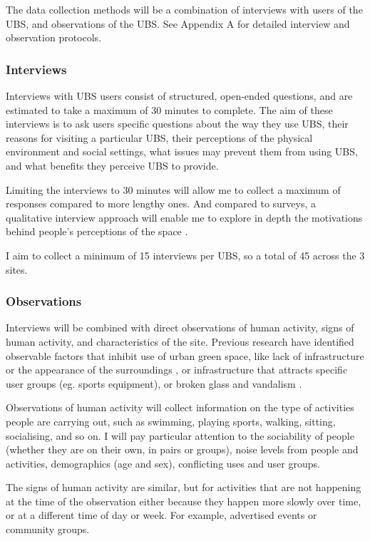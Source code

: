 \documentclass{article}
\begin{document}
The data collection methods will be a combination of interviews with users of the UBS, and observations of the UBS. See Appendix A for detailed interview and observation protocols.

\subsubsection{Interviews}

Interviews with UBS users consist of structured, open-ended questions, and are estimated to take a maximum of 30 minutes to complete. The aim of these interviews is to ask users specific questions about the way they use UBS, their reasons for visiting a particular UBS, their perceptions of the physical environment and social settings, what issues may prevent them from using UBS, and what benefits they perceive UBS to provide.

Limiting the interviews to 30 minutes will allow me to collect a maximum of responses compared to more lengthy ones. And compared to surveys, a qualitative interview approach will enable me to explore in depth the motivations behind people's perceptions of the space \parencite{noel2021social}.

I aim to collect a minimum of 15 interviews per UBS, so a total of 45 across the 3 sites.

\subsubsection{Observations}

Interviews will be combined with direct observations of human activity, signs of human activity, and characteristics of the site. Previous research have identified observable factors that inhibit use of urban green space, like lack of infrastructure or the appearance of the surroundings \parencite{raymond2016integrating}, or infrastructure that attracts specific user groups (eg. sports equipment), or broken glass and vandalism \parencite{noel2021social}.

Observations of human activity will collect information on the type of activities people are carrying out, such as swimming, playing sports, walking, sitting, socialising, and so on. I will pay particular attention to the sociability of people (whether they are on their own, in pairs or groups), noise levels from people and activities, demographics (age and sex), conflicting uses and user groups.

The signs of human activity are similar, but for activities that are not happening at the time of the observation either because they happen more slowly over time, or at a different time of day or week. For example, advertised events or community groups.
\end{document}
